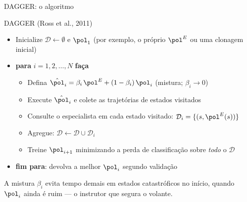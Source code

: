 \documentclass[aspectratio=169, 11pt]{beamer}
\newcommand{\polE}{\pol^{E}}                     %
\newcommand{\Dset}{\mathcal{D}}
\begin{document}
\begin{frame}[shrink]{DAGGER: o algoritmo}

  \begin{algbox}{DAGGER (Ross et al., 2011)}
    {\footnotesize
    \begin{itemize}\setlength{\itemsep}{0.15ex}
      \item Inicialize $\Dset \leftarrow \emptyset$ e $\pol_1$ (por exemplo, o
        próprio $\polE$ ou uma clonagem inicial)
      \item \textbf{para} $i = 1, 2, \dots, N$ \textbf{faça}
        \begin{itemize}\setlength{\itemsep}{0.1ex}
          \item Defina $\hat\pol_i = \beta_i\,\polE + (1-\beta_i)\,\pol_i$
            \hfill{\scriptsize(mistura; $\beta_i \to 0$)}
          \item Execute $\hat\pol_i$ e colete as trajetórias de estados visitados
          \item Consulte o especialista em cada estado visitado:
            $\Dset_i = \{(s, \polE(s))\}$
          \item Agregue: $\Dset \leftarrow \Dset \cup \Dset_i$
          \item Treine $\pol_{i+1}$ minimizando a perda de classificação sobre
            \emph{todo} o $\Dset$
        \end{itemize}
      \item \textbf{fim para}: devolva a melhor $\pol_i$ segundo validação
    \end{itemize}}
  \end{algbox}

  \begin{ideiabox}
    A mistura $\beta_i$ evita tempo demais em estados catastróficos no início,
    quando $\pol_i$ ainda é ruim --- o instrutor que segura o volante.
  \end{ideiabox}
\end{frame}
\end{document}
